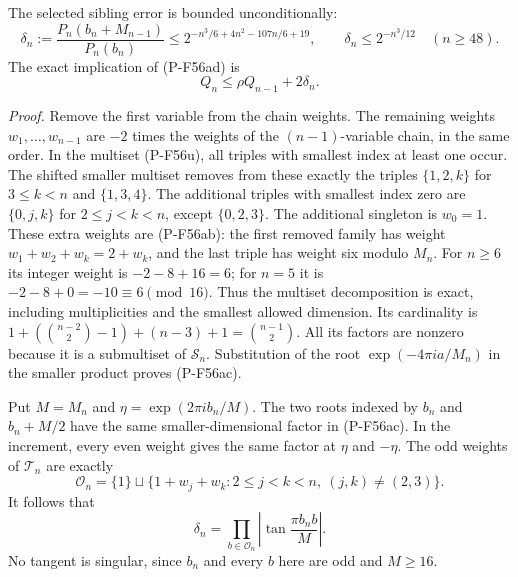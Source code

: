 The selected sibling error is bounded unconditionally:
\[
 \delta_n:=
 \frac{P_n(b_n+M_{n-1})}{P_n(b_n)}
 \le
 2^{-n^3/6+4n^2-107n/6+19},
 \qquad
 \delta_n\le2^{-n^3/12}\quad(n\ge48).
 \tag{P-F56ae}
\]
The exact implication of (P-F56ad) is
\[
                         Q_n\le\rho Q_{n-1}+2\delta_n.
 \tag{P-F56af}
\]

\emph{Proof.}
Remove the first variable from the chain weights.
The remaining weights $w_1,\ldots,w_{n-1}$ are $-2$
times the weights of the $(n-1)$-variable chain, in the
same order. In the multiset (P-F56u), all triples with
smallest index at least one occur. The shifted smaller
multiset removes from these exactly the triples
$\{1,2,k\}$ for $3\le k<n$ and $\{1,3,4\}$.
The additional triples with smallest index zero are
$\{0,j,k\}$ for $2\le j<k<n$, except $\{0,2,3\}$.
The additional singleton is $w_0=1$.
These extra weights are (P-F56ab): the first removed
family has weight $w_1+w_2+w_k=2+w_k$, and the last
triple has weight six modulo $M_n$.
For $n\ge6$ its integer weight is $-2-8+16=6$;
for $n=5$ it is $-2-8+0=-10\equiv6\pmod {16}$.
Thus the multiset decomposition is exact, including
multiplicities and the smallest allowed dimension.
Its cardinality is
$1+(\binom{n-2}2-1)+(n-3)+1=\binom{n-1}2$.
All its factors are nonzero because it is a submultiset
of $\mathcal S_n$. Substitution of the root
$\exp(-4\pi ia/M_n)$ in the smaller product proves
(P-F56ac).

Put $M=M_n$ and $\eta=\exp(2\pi ib_n/M)$.
The two roots indexed by $b_n$ and $b_n+M/2$
have the same smaller-dimensional factor in (P-F56ac).
In the increment, every even weight gives the same
factor at $\eta$ and $-\eta$.
The odd weights of $\mathcal T_n$ are exactly
\[
 \mathcal O_n=
 \{1\}\sqcup
 \{1+w_j+w_k:2\le j<k<n,\ (j,k)\ne(2,3)\}.
 \]
It follows that
\[
                 \delta_n
       =\prod_{b\in\mathcal O_n}
                     \left|\tan\frac{\pi b_n b}{M}\right|.
 \tag{P-F56ag}
\]
No tangent is singular, since $b_n$ and every $b$ here
are odd and $M\ge16$.

